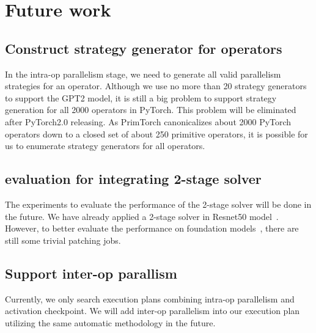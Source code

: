 \section{Future work}

\subsection{Construct strategy generator for operators}
In the intra-op parallelism stage, we need to generate all valid parallelism strategies for an operator. Although we use no more than 20 strategy generators to support the GPT2 model, it is still a big problem to support strategy generation for all 2000 operators in PyTorch. This problem will be eliminated after PyTorch2.0 releasing. As PrimTorch canonicalizes about 2000 PyTorch operators down to a closed set of about 250 primitive operators, it is possible for us to enumerate strategy generators for all operators.

\subsection{evaluation for integrating 2-stage solver}
The experiments to evaluate the performance of the 2-stage solver will be done in the future. We have already applied a 2-stage solver in Resnet50 model~\cite{he2016deep}. However, to better evaluate the performance on foundation models~\cite{bommasani2021opportunities}, there are still some trivial patching jobs.

\subsection{Support inter-op parallism}

Currently, we only search execution plans combining intra-op parallelism and activation checkpoint. We will add inter-op parallelism into our execution plan utilizing the same automatic methodology in the future. 